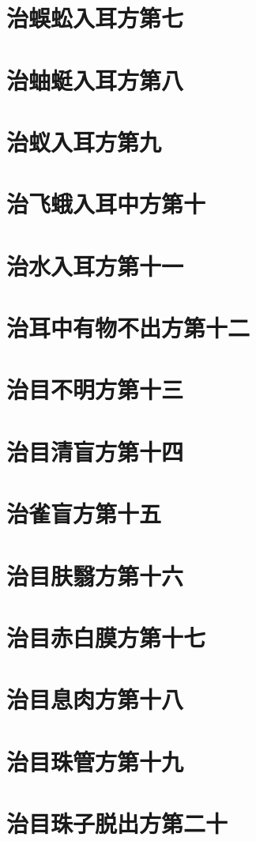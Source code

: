 \documentclass[a4paper,12pt,UTF8,twoside]{ctexbook}
\begin{document}
\chapter{治蜈蚣入耳方第七}
\chapter{治蚰蜓入耳方第八}
\chapter{治蚁入耳方第九}
\chapter{治飞蛾入耳中方第十}
\chapter{治水入耳方第十一}
\chapter{治耳中有物不出方第十二}
\chapter{治目不明方第十三}
\chapter{治目清盲方第十四}
\chapter{治雀盲方第十五}
\chapter{治目肤翳方第十六}
\chapter{治目赤白膜方第十七}
\chapter{治目息肉方第十八}
\chapter{治目珠管方第十九}
\chapter{治目珠子脱出方第二十}
\end{document}
